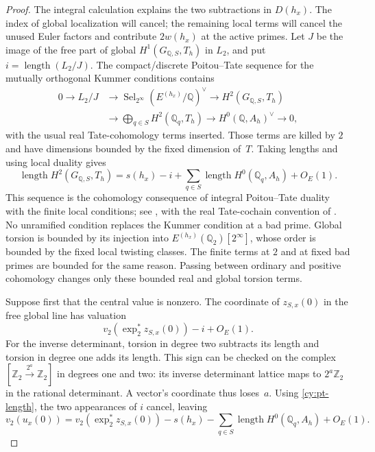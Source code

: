 \begin{proof}
The integral calculation explains the two subtractions in $D(h_x)$.
The index of global localization will cancel; the remaining local terms
will cancel the unused Euler factors and contribute $2w(h_x)$ at the
active primes.  Let $J$ be the image of the free part of global
$H^1(G_{\mathbb Q,S},T_h)$ in $L_2$, and put
$i=\operatorname{length}(L_2/J)$.  The compact/discrete Poitou--Tate
sequence for the mutually orthogonal Kummer conditions contains
\[
\begin{aligned}
 0\longrightarrow L_2/J
 &\longrightarrow \operatorname{Sel}_{2^\infty}(E^{(h_x)}/\mathbb Q)^\vee
 \longrightarrow H^2(G_{\mathbb Q,S},T_h)\\
 &\longrightarrow \bigoplus_{q\in S}H^2(\mathbb Q _q,T_h)
 \longrightarrow H^0(\mathbb Q,A_h)^\vee\longrightarrow0,
\end{aligned}
\]
with the usual real Tate-cohomology terms inserted.  Those terms are
killed by $2$ and have dimensions bounded by the fixed dimension of~$T$.
Taking lengths and using local duality gives
\begin{equation}\label{cy:pt-length}
 \operatorname{length}H^2(G_{\mathbb Q,S},T_h)
   =s(h_x)-i+\sum_{q\in S}\operatorname{length}H^0(\mathbb Q _q,A_h)
      +O_E(1).
\end{equation}
This sequence is the cohomology consequence of integral
Poitou--Tate duality with the finite local conditions; see
\cite[Theorem~6.3.4 and Section~6.9.1]{Nekovar2006}, with the real
Tate-cochain convention of \cite[Section~5.7.1.6]{Nekovar2006}.
No unramified condition replaces
the Kummer condition at a bad prime.  Global torsion is bounded by its
injection into $E^{(h_x)}(\mathbb Q _2)[2^\infty]$, whose order is bounded
by the fixed local twisting classes.  The finite terms at $2$ and at
fixed bad primes are bounded for the same reason.  Passing between
ordinary and positive cohomology changes only these bounded real and
global torsion terms.

Suppose first that the central value is nonzero.  The coordinate of
$z_{S,x}(0)$ in the free global line has valuation
\[
 v_2(\exp_2^*z_{S,x}(0))-i+O_E(1).
\]
For the inverse determinant, torsion in degree two subtracts its length
and torsion in degree one adds its length.  This sign can be checked on
the complex $[\mathbb Z _2\xrightarrow{2^a}\mathbb Z _2]$ in degrees one
and two: its inverse determinant lattice maps to $2^a\mathbb Z _2$ in
the rational determinant.  A vector's coordinate thus loses~$a$.
Using \eqref{cy:pt-length}, the two appearances of $i$ cancel, leaving
\[
 v_2(u_x(0))=
 v_2(\exp_2^*z_{S,x}(0))-s(h_x)
       -\sum_{q\in S}\operatorname{length}H^0(\mathbb Q _q,A_h)+O_E(1).
\]


\end{proof}
